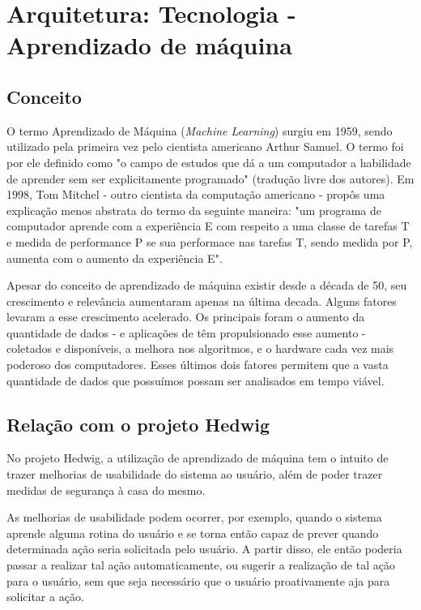 \chapter{Arquitetura: Tecnologia - Aprendizado de máquina}

	\section{Conceito}
		O termo Aprendizado de Máquina (\emph{Machine Learning}) surgiu em 1959, sendo utilizado pela primeira vez  pelo cientista americano Arthur Samuel. O termo foi por ele definido como "o campo de estudos que dá a um computador a habilidade de aprender sem ser explicitamente programado" (tradução livre dos autores). Em 1998, Tom Mitchel - outro cientista da computação americano - propôs uma explicação menos abstrata do termo da seguinte maneira: "um programa de computador aprende com a experiência E com respeito a uma classe de tarefas T e medida de performance P se sua performace nas tarefas T, sendo medida por P, aumenta com o aumento da experiência E".

		Apesar do conceito de aprendizado de máquina existir desde a década de 50, seu crescimento e relevância aumentaram apenas na última decada. Alguns fatores levaram a esse crescimento acelerado. Os principais foram o aumento da quantidade de dados - e aplicações de \wiot têm propulsionado esse aumento - coletados e disponíveis, a melhora nos algoritmos, e o hardware cada vez mais poderoso dos computadores. Esses últimos dois fatores permitem que a vasta quantidade de dados que possuímos possam ser analisados em tempo viável.

	\section{Relação com o projeto Hedwig}
		No projeto Hedwig, a utilização de aprendizado de máquina tem o intuito de trazer melhorias de usabilidade do sistema ao usuário, além de poder trazer medidas de segurança à casa do mesmo.

		As melhorias de usabilidade podem ocorrer, por exemplo, quando o sistema aprende alguma rotina do usuário e se torna então capaz de prever quando determinada ação seria solicitada pelo usuário. A partir disso, ele então poderia passar a realizar tal ação automaticamente, ou sugerir a realização de tal ação para o usuário, sem que seja necessário que o usuário proativamente aja para solicitar a ação.


